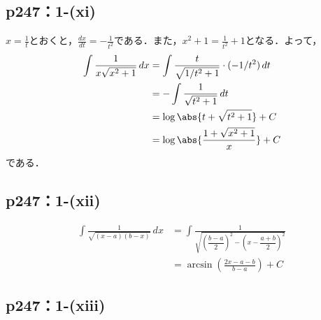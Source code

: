 \subsection*{p247：1-(xi)}


\begin{tanswer}
    $x=\frac{1}{t}$とおくと，$\frac{dx}{dt}=-\frac{1}{t^2}$である．また，$x^2+1 = \frac{1}{t^2} +1$となる．よって，
    \begin{align*}
        \int \frac{1}{x\sqrt{x^2+1}} \, dx & = \int \frac{t}{\sqrt{1/t^2+1}} \cdot (-1/t^2) \, dt \\
                                           & = -\int \frac{1}{\sqrt{t^2+1}} \, dt                 \\
                                           & = \log \abs{t+\sqrt{t^2+1}}+ C                       \\
                                           & = \log \abs{\frac{1+\sqrt{x^2+1}}{x}}+C
    \end{align*}
    である．
\end{tanswer}


\subsection*{p247：1-(xii)}


\begin{tanswer}
    \begin{align*}
        \int \frac{1}{\sqrt{(x-a)(b-x)}} \, dx & = \int \frac{1}{\sqrt{\left (\dfrac{b-a}{2} \right )^2 - \left (x-\dfrac{a+b}{2} \right )^2 }} \\
                                               & = \arcsin \left(\frac{2x-a-b}{b-a} \right)+C
    \end{align*}
\end{tanswer}

\subsection*{p247：1-(xiii)}


